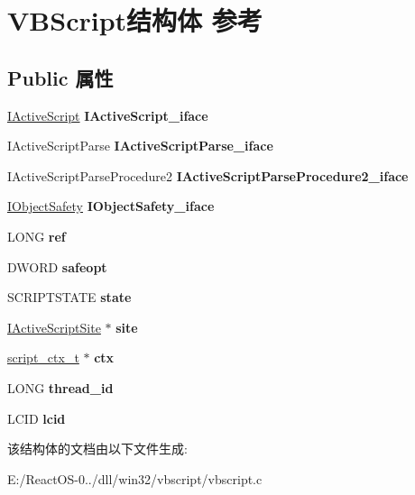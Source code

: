 \hypertarget{struct_v_b_script}{}\section{V\+B\+Script结构体 参考}
\label{struct_v_b_script}
\subsection*{Public 属性}
\begin{DoxyCompactItemize}
\item 
\mbox{\label{struct_v_b_script_adc5f0fbb101ac15f8324a7c3ca5a17a1}} 
\hyperlink{interface_i_active_script}{I\+Active\+Script} {\bfseries I\+Active\+Script\+\_\+iface}
\item 
\mbox{\label{struct_v_b_script_ad248adee55108bb66c583e9e90bc4623}} 
I\+Active\+Script\+Parse {\bfseries I\+Active\+Script\+Parse\+\_\+iface}
\item 
\mbox{\label{struct_v_b_script_a30e1c0f82b24a75361533cb4838f3210}} 
I\+Active\+Script\+Parse\+Procedure2 {\bfseries I\+Active\+Script\+Parse\+Procedure2\+\_\+iface}
\item 
\mbox{\label{struct_v_b_script_afe23925b2dea5c0e4e46e08c90709a5a}} 
\hyperlink{interface_i_object_safety}{I\+Object\+Safety} {\bfseries I\+Object\+Safety\+\_\+iface}
\item 
\mbox{\label{struct_v_b_script_aba5205aa175255866866eb463bf0437f}} 
L\+O\+NG {\bfseries ref}
\item 
\mbox{\label{struct_v_b_script_ae14dd9df33f5277cd720a60313ab259e}} 
D\+W\+O\+RD {\bfseries safeopt}
\item 
\mbox{\label{struct_v_b_script_aa0a1b64e5abf2c1e1ac09b21a28d0cd4}} 
S\+C\+R\+I\+P\+T\+S\+T\+A\+TE {\bfseries state}
\item 
\mbox{\label{struct_v_b_script_a41e57360a3348501a9e8098558037056}} 
\hyperlink{interface_i_active_script_site}{I\+Active\+Script\+Site} $\ast$ {\bfseries site}
\item 
\mbox{\label{struct_v_b_script_a8445e21e030395e807a39bf8ce8a4e5b}} 
\hyperlink{struct__script__ctx__t}{script\+\_\+ctx\+\_\+t} $\ast$ {\bfseries ctx}
\item 
\mbox{\label{struct_v_b_script_a01f5fb8476727fdcd9772497ad76ce53}} 
L\+O\+NG {\bfseries thread\+\_\+id}
\item 
\mbox{\label{struct_v_b_script_a8be4dbcef5b807cf7b3f7b6b404b49b8}} 
L\+C\+ID {\bfseries lcid}
\end{DoxyCompactItemize}


该结构体的文档由以下文件生成\+:\begin{DoxyCompactItemize}
\item 
E\+:/\+React\+O\+S-\/0../dll/win32/vbscript/vbscript.\+c\end{DoxyCompactItemize}
